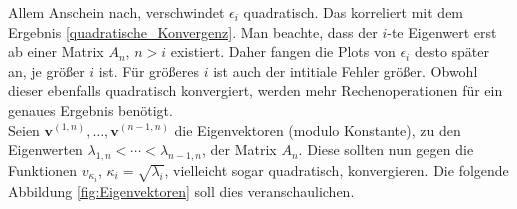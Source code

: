 Allem Anschein nach, verschwindet $\epsilon_i$ quadratisch. Das korreliert mit dem Ergebnis \eqref{quadratische_Konvergenz}. Man beachte, dass der $i$-te Eigenwert erst ab einer Matrix $A_n$, $n > i$ existiert. Daher fangen die Plots von $\epsilon_i$ desto später an, je größer $i$ ist. Für größeres $i$ ist auch der intitiale Fehler größer. Obwohl dieser ebenfalls quadratisch konvergiert, werden mehr Rechenoperationen für ein genaues Ergebnis benötigt. \\

Seien $\mathbf{v}^{(1, n)}, \ldots, \mathbf{v}^{(n-1, n)}$ die Eigenvektoren (modulo Konstante), zu den Eigenwerten $\lambda_{1, n} < \cdots < \lambda_{n-1, n}$, der Matrix $A_n$. Diese sollten nun gegen die Funktionen $v_{\kappa_i}$, $\kappa_i = \sqrt{\lambda_i}$, vielleicht sogar quadratisch, konvergieren. Die folgende Abbildung \ref{fig:Eigenvektoren} soll dies veranschaulichen.

